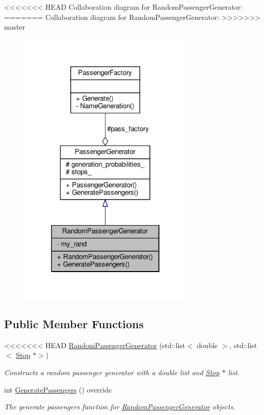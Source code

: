 <<<<<<< HEAD
Collaboration diagram for Random\+Passenger\+Generator\+:\nopagebreak
=======
Collaboration diagram for Random\+Passenger\+Generator\+:
\nopagebreak
>>>>>>> master
\begin{figure}[H]
\begin{center}
\leavevmode
\includegraphics[width=238pt]{classRandomPassengerGenerator__coll__graph}
\end{center}
\end{figure}
\subsection*{Public Member Functions}
\begin{DoxyCompactItemize}
\item 
<<<<<<< HEAD
\hyperlink{classRandomPassengerGenerator_a1be1b4abfe82bfe95eb0a078d9a3342d}{Random\+Passenger\+Generator} (std\+::list$<$ double $>$, std\+::list$<$ \hyperlink{classStop}{Stop} $\ast$$>$)
\begin{DoxyCompactList}\small\item\em Constructs a random passenger generator with a double list and \hyperlink{classStop}{Stop} $\ast$ list. \end{DoxyCompactList}\item 
int \hyperlink{classRandomPassengerGenerator_aba2d80cde33371cf9c3d033f1b8ba6b8}{Generate\+Passengers} () override
\begin{DoxyCompactList}\small\item\em The generate passengers function for \hyperlink{classRandomPassengerGenerator}{Random\+Passenger\+Generator} objects. \end{DoxyCompactList}\end{DoxyCompactItemize}
